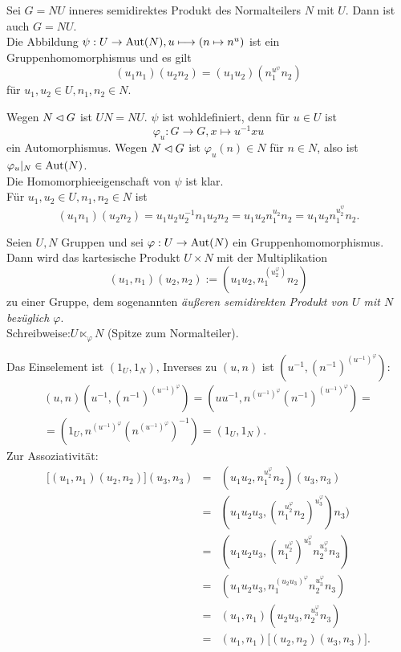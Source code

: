 \begin{bemerkung}
 Sei $G=NU$ inneres semidirektes Produkt des Normalteilers $N$ mit $U$. Dann ist auch $G=NU$.\\
Die Abbildung $\psi:U\to \operatorname{Aut}(N), u\longmapsto (n\mapsto n^u)$ ist ein Gruppenhomomorphismus und es gilt $$(u_1n_1)(u_2n_2)=(u_1u_2)(n_1^{u^\psi}n_2)$$ f\"ur $u_1, u_2 \in U, n_1, n_2\in N$.
\end{bemerkung}

\begin{beweis}
 Wegen $N\lhd G$ ist $UN=NU$. $\psi$ ist wohldefiniert, denn f\"ur $u\in U$ ist $$\varphi_u:G\to G, x\longmapsto u^{-1}xu$$ ein Automorphismus. Wegen $N\lhd G$ ist $\varphi_u(n)\in N$ f\"ur $n\in N$, also ist $\varphi_u|_N\in \operatorname{Aut}(N)$. \\Die Homomorphieeigenschaft von $\psi$ ist klar.\\
F\"ur $u_1, u_2\in U, n_1, n_2\in N$ ist 
$$(u_1n_1)(u_2n_2)=u_1u_2u_2^{-1}n_1u_2n_2=u_1u_2n_1^{u_2}n_2=u_1u_2n_1^{u_2^\psi}n_2.$$
\end{beweis}

\begin{defundsatz} 
 Seien $U,N$ Gruppen und sei $\varphi:U\to \operatorname{Aut}(N)$ ein Gruppenhomomorphismus. Dann wird das kartesische Produkt $U\times N$ mit der Multiplikation 
$$(u_1,n_1)(u_2,n_2):=(u_1u_2,n_1^{(u_2^\varphi)}n_2)$$ zu einer Gruppe, dem sogenannten \emph{\"au\ss{}eren semidirekten Produkt von $U$ mit $N$ bez\"uglich $\varphi$}.\\
Schreibweise:$U \ltimes_\varphi N$ (Spitze zum Normalteiler).
\end{defundsatz}


\begin{beweis}
 Das Einselement ist $(1_U,1_N)$, Inverses zu $(u,n)$ ist $(u^{-1},(n^{-1})^{(u^{-1})^{\varphi}})$:
\begin{eqnarray*}(u,n)(u^{-1},(n^{-1})^{(u^{-1})^{\varphi}})=(uu^{-1},n^{(u^{-1})^\varphi}(n^{-1})^{(u^{-1})^{\varphi}})=\\=(1_U,n^{(u^{-1})^\varphi}(n^{(u^{-1})^\varphi})^{-1})=(1_U,1_N).\end{eqnarray*}
Zur Assoziativit\"at:
\begin{eqnarray*}\lbrack (u_1,n_1)(u_2,n_2)\rbrack (u_3,n_3) &=& (u_1u_2,n_1^{u_2^\varphi}n_2)(u_3,n_3) \\&=& (u_1u_2u_3,(n_1^{u_2^\varphi}n_2)^{u_3^\varphi})n_3) \\&=& (u_1u_2u_3,(n_1^{u_2^\varphi})^{u_3^{\varphi}}n_2^{u_3^\varphi}n_3) \\&=& (u_1u_2u_3,n_1^{(u_2u_3)^\varphi}n_2^{u_3^\varphi}n_3) \\&=& (u_1,n_1)(u_2u_3,n_2^{u_3^\varphi}n_3) \\&=& (u_1,n_1)\lbrack (u_2,n_2)(u_3,n_3) \rbrack.
\end{eqnarray*}
\end{beweis}


